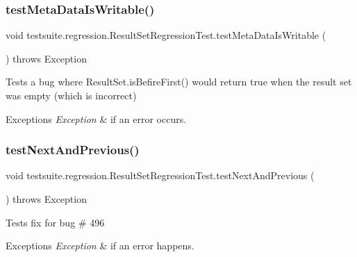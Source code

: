 \subsubsection{\texorpdfstring{test\+Meta\+Data\+Is\+Writable()}{testMetaDataIsWritable()}}
{\footnotesize\ttfamily void testsuite.\+regression.\+Result\+Set\+Regression\+Test.\+test\+Meta\+Data\+Is\+Writable (\begin{DoxyParamCaption}{ }\end{DoxyParamCaption}) throws Exception}

Tests a bug where Result\+Set.\+is\+Befire\+First() would return true when the result set was empty (which is incorrect)


\begin{DoxyExceptions}{Exceptions}
{\em Exception} & if an error occurs. \\
\hline
\end{DoxyExceptions}
\mbox{\label{classtestsuite_1_1regression_1_1_result_set_regression_test_a0c13a2fe761dffa7df042ede36d977f4}} 
\subsubsection{\texorpdfstring{test\+Next\+And\+Previous()}{testNextAndPrevious()}}
{\footnotesize\ttfamily void testsuite.\+regression.\+Result\+Set\+Regression\+Test.\+test\+Next\+And\+Previous (\begin{DoxyParamCaption}{ }\end{DoxyParamCaption}) throws Exception}

Tests fix for bug \# 496


\begin{DoxyExceptions}{Exceptions}
{\em Exception} & if an error happens. \\
\hline
\end{DoxyExceptions}
\mbox{\label{classtestsuite_1_1regression_1_1_result_set_regression_test_a87b5a0b26c6031bfbaef6527e26abb40}} 
